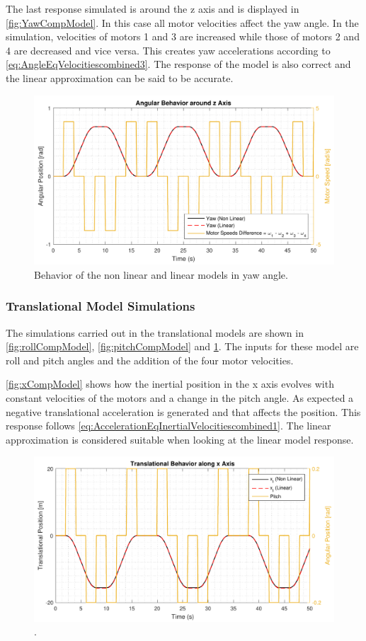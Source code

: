 %
The last response simulated is around the z axis and is displayed in \autoref{fig:YawCompModel}. In this case all motor velocities affect the yaw angle. In the simulation, velocities of motors 1 and 3 are increased while those of motors 2 and 4 are decreased and vice versa. This creates yaw accelerations according to \autoref{eq:AngleEqVelocitiescombined3}. The response of the model is also correct and the linear approximation can be said to be accurate. 
%
\begin{figure}[H]
	\centering
	\includegraphics[scale=0.65]{figures/yawCompModel}
	\caption{Behavior of the non linear and linear models in yaw angle.}
	\label{fig:yawCompModel}
\end{figure}

\subsubsection{Translational Model Simulations}
The simulations carried out in the translational models are shown in  \autoref{fig:rollCompModel}, \ref{fig:pitchCompModel} and \ref{fig:yawCompModel}. The inputs for these model are roll and pitch angles and the addition of the four motor velocities. 

\autoref{fig:xCompModel} shows how the inertial position in the x axis evolves with constant velocities of the motors and a change in the pitch angle. As expected a negative translational acceleration is generated and that affects the position. This response follows \autoref{eq:AccelerationEqInertialVelocitiescombined1}. The linear approximation is considered suitable when looking at the linear model response.
\begin{figure}[H]
	\centering
	\includegraphics[scale=0.65]{figures/xCompModel}
	\caption{.}
	\label{fig:xCompModel}
\end{figure}

